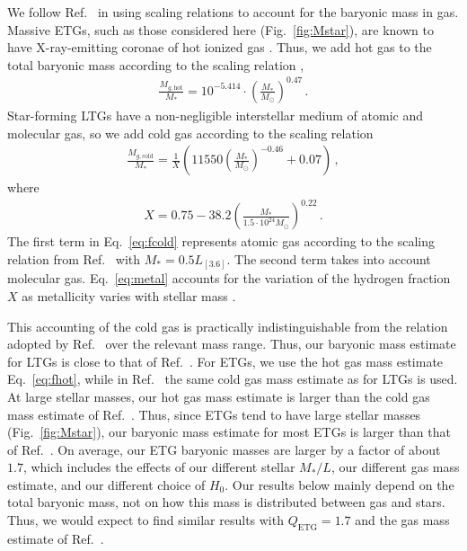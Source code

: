 \documentclass[a4paper,11pt]{article}
\begin{document}
We follow Ref.~\cite{Brouwer2021} in using scaling relations to account for the baryonic mass in gas.
Massive ETGs, such as those considered here (Fig.~\ref{fig:Mstar}), are known to have X-ray-emitting coronae of hot ionized gas \citep[e.g.,][]{Buote2012}.
Thus, we add hot gas to the total baryonic mass according to the scaling relation \citep{Chae2021b},
\begin{align}
 \label{eq:fhot}
 \frac{M_{g,\mathrm{hot}}}{M_\ast} = 10^{-5.414} \cdot \left(\frac{M_\ast}{M_\odot}\right)^{0.47} \,.
\end{align}
Star-forming LTGs have a non-negligible interstellar medium of atomic and molecular gas, so we add cold gas according to the scaling relation
\begin{align}
 \label{eq:fcold}
 \frac{M_{g,\mathrm{cold}}}{M_\ast} = \frac{1}{X} \left(11550 \left(\frac{M_\ast}{M_\odot}\right)^{-0.46} + 0.07 \right) \,,
\end{align}
where
\begin{align}
 \label{eq:metal}
 X = 0.75  - 38.2 \left(\frac{M_\ast}{1.5\cdot10^{24}M_\odot}\right)^{0.22} \,.
\end{align}
The first term in Eq.~\eqref{eq:fcold} represents atomic gas according to the scaling relation from Ref.~\cite{Lelli2016} with $M_\ast = 0.5 L_{[3.6]}$.
The second term takes into account molecular gas.
Eq.~\eqref{eq:metal} accounts for the variation of the hydrogen fraction $X$ as metallicity varies with stellar mass \citep{McGaugh2020b}.

This accounting of the cold gas is practically indistinguishable from the relation adopted by Ref.~\cite{Brouwer2021} over the relevant mass range.
Thus, our baryonic mass estimate for LTGs is close to that of Ref.~\cite{Brouwer2021}.
For ETGs, we use the hot gas mass estimate Eq.~\eqref{eq:fhot}, while in Ref.~\cite{Brouwer2021} the same cold gas mass estimate as for LTGs is used.
At large stellar masses, our hot gas mass estimate is larger than the cold gas mass estimate of Ref.~\cite{Brouwer2021}.
Thus, since ETGs tend to have large stellar masses (Fig.~\ref{fig:Mstar}), our baryonic mass estimate for most ETGs is larger than that of Ref.~\cite{Brouwer2021}.
On average,  our ETG baryonic masses are larger by a factor of about $1.7$, which includes the effects of our different stellar $M_\ast/L$, our different gas mass estimate, and our different choice of $H_0$.
Our results below mainly depend on the total baryonic mass, not on how this mass is distributed between gas and stars.
Thus, we would expect to find similar results with $Q_{\mathrm{ETG}} = 1.7$ and the gas mass estimate of Ref.~\cite{Brouwer2021}.
\end{document}
